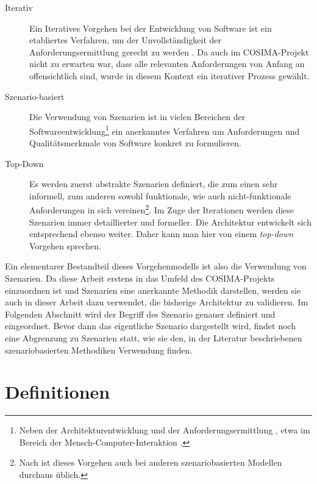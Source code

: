   \begin{description}
    \item[Iterativ] Ein Iteratives Vorgehen bei der Entwicklung von Software ist ein etabliertes Verfahren, um der Unvollständigkeit der Anforderungsermittlung gerecht zu werden \citep{brooks1987nsb,basili2005iea,boehm1986sm,kruchten2003rup}. Da auch im COSIMA-Projekt nicht zu erwarten war, dass alle relevanten Anforderungen von Anfang an offensichtlich sind, wurde in diesem Kontext ein iterativer Prozess gewählt.
    \item[Szenario-basiert] Die Verwendung von Szenarien ist in vielen Bereichen der Softwareentwicklung\footnote{Neben der Architekturentwicklung \citep{software_architecture_in_practice,scenario_based_software_architecture_evaluation_methods} und der Anforderungsermittlung \citep{weidenhaupt1998sus}, etwa im Bereich der Mensch-Computer-Interaktion \citep{five_reasons_for_scenario_based_design}.} ein anerkanntes Verfahren um Anforderungen und Qualitätsmerkmale von Software konkret zu formulieren.
    \item[Top-Down] Es werden zuerst abstrakte Szenarien definiert, die zum einen sehr informell, zum anderen sowohl funktionale, wie auch nicht-funktionale Anforderungen in sich vereinen\footnote{Nach  \citep[S. 42f]{weidenhaupt1998ssd} ist dieses Vorgehen auch bei anderen szenariobasierten Modellen durchaus üblich.}. Im Zuge der Iterationen werden diese Szenarien immer detaillierter und formeller. Die Architektur entwickelt sich entsprechend ebenso weiter. Daher kann man hier von einem \emph{top-down} Vorgehen sprechen.
  \end{description}
  
  Ein elementarer Bestandteil dieses Vorgehenmodells ist also die Verwendung von Szenarien. Da diese Arbeit erstens in das Umfeld des COSIMA-Projekts einzuordnen ist und Szenarien eine anerkannte Methodik darstellen, werden sie auch in dieser Arbeit dazu verwendet, die bisherige Architektur zu validieren. Im Folgenden Abschnitt wird der Begriff des Szenario genauer definiert und eingeordnet. Bevor dann das eigentliche Szenario dargestellt wird, findet noch eine Abgrenzung zu Szenarien statt, wie sie den, in der Literatur beschriebenen szenariobasierten Methodiken Verwendung finden.
  
\section{Definitionen} %
\label{sec:definition_szenario}

